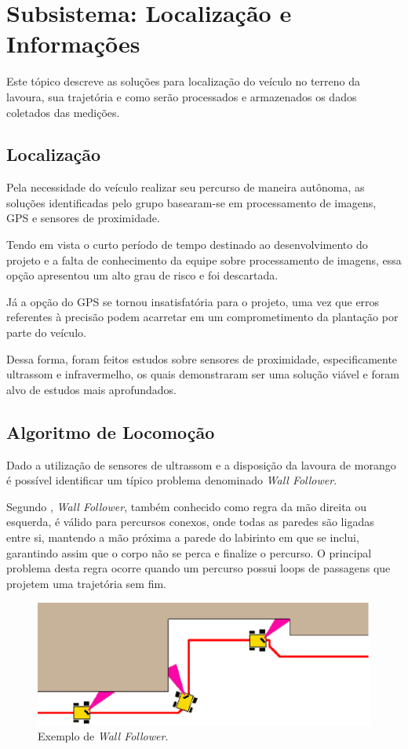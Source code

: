 \section{Subsistema: Localização e Informações}
Este tópico descreve as soluções para localização do veículo no terreno da lavoura, sua trajetória e
como serão processados e armazenados os dados coletados das medições.

  \subsection{Localização}

  Pela necessidade do veículo realizar seu percurso de maneira autônoma, as soluções identificadas
  pelo grupo basearam-se em processamento de imagens, GPS e sensores de proximidade.

  Tendo em vista o curto período de tempo destinado ao desenvolvimento do projeto e a falta de
  conhecimento da equipe sobre processamento de imagens, essa opção apresentou um alto grau de risco
  e foi descartada.

  Já a opção do GPS se tornou insatisfatória para o projeto, uma vez que erros
  referentes à precisão podem acarretar em um comprometimento da plantação
  por parte do veículo.

  Dessa forma, foram feitos estudos sobre sensores de proximidade, especificamente
  ultrassom e infravermelho, os quais demonstraram ser uma solução viável e foram alvo de
  estudos mais aprofundados.


  \subsection{Algoritmo de Locomoção}
    Dado a utilização de sensores de ultrassom e a disposição da lavoura de morango
    é possível identificar um típico problema denominado \textit{Wall Follower}.

    Segundo \cite{huang2009}, \textit{Wall Follower},
    também conhecido como regra da mão direita ou esquerda, é válido para percursos conexos, onde todas as paredes são ligadas entre si, mantendo a mão próxima a parede do labirinto em
    que se inclui, garantindo assim que o corpo não se perca e finalize
    o percurso. O principal problema desta regra ocorre quando um percurso
    possui loops de passagens que projetem uma trajetória sem fim.

    \begin{figure}[!htbp]
    \begin{center}
    \includegraphics[width=.7\textwidth]{figuras/wallfollower.eps}
    \caption{\label{fig:wallfollower}Exemplo de \textit{Wall Follower}.}
    \end{center}
    \end{figure}

